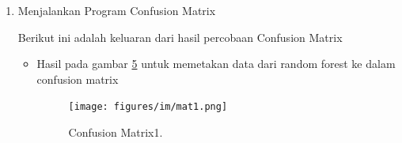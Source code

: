 \begin{enumerate}
\begin{itemize}
\item Hasil pada gambar \ref{rons15} mengimport library sklearn ensemble untuk memanggil RandomForestClassifier, max features itu sebagai tanda ada berapa kolom untuk setiap tree nya pada kali ini setiap tree memiliki 50 kolom dengan estimasi 100 tree.
 		\begin{figure}[ht]
		\centerline{\texttt{[image: figures/im/rons15.png]}}
		\caption{Klasifikasi Random Forest15.}
		\label{rons15}
		\end{figure}

\item Hasil pada gambar \ref{rons16} hasil dari fit untuk membuat random forest dengan kategori yang sudah ditentukan dengan maksimum fitur sebanyak 50 kolom untuk setiap tree nya dengan estimasi 100 tree
 		\begin{figure}[ht]
		\centerline{\texttt{[image: figures/im/rons16.png]}}
		\caption{Klasifikasi Random Forest16.}
		\label{rons16}
		\end{figure}

\item Hasil pada gambar \ref{rons17} menampilkan hasil prediksi pada step sebelumnya pada random forest
 		\begin{figure}[ht]
		\centerline{\texttt{[image: figures/im/rons17.png]}}
		\caption{Klasifikasi Random Forest17.}
		\label{rons17}
		\end{figure}

\item Hasil pada gambar \ref{rons18} menampilkan hasil presentasi akurasi dengan menggunakan algoritma random forest
 		\begin{figure}[ht]
		\centerline{\texttt{[image: figures/im/rons18.png]}}
		\caption{Klasifikasi Random Forest18.}
		\label{rons18}
		\end{figure}
\end{itemize}

\item Menjalankan Program Confusion Matrix \par
Berikut ini adalah keluaran dari hasil percobaan Confusion Matrix
\begin{itemize}
\item Hasil pada gambar \ref{mat1} untuk memetakan data dari random forest ke dalam confusion matrix
 		\begin{figure}[ht]
		\centerline{\texttt{[image: figures/im/mat1.png]}}
		\caption{Confusion Matrix1.}
		\label{mat1}
		\end{figure}


\end{itemize}
\end{enumerate}
